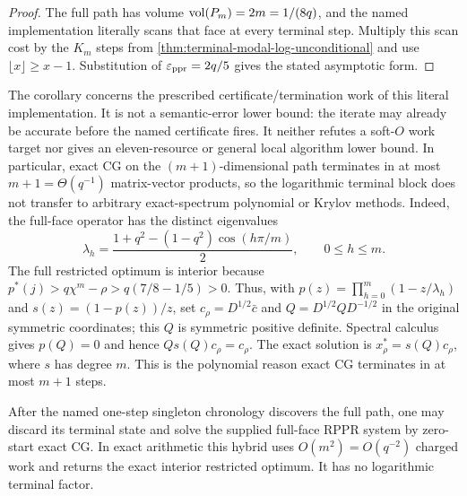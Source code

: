 \begin{proof}
The full path has volume $\operatorname{vol}(P_m)=2m=1/(8q)$, and the named implementation
literally scans that face at every terminal step.  Multiply this scan cost by
the $K_m$ steps from
\cref{thm:terminal-modal-log-unconditional} and use
$\lfloor x\rfloor\ge x-1$.  Substitution of
$\varepsilon_{\mathrm{ppr}}=2q/5$ gives the stated asymptotic form.
\end{proof}

\begin{remark}
The corollary concerns the prescribed certificate/termination work of this
literal implementation.  It is not a semantic-error lower bound: the iterate
may already be accurate before the named certificate fires.  It neither
refutes a soft-$O$ work target nor gives an eleven-resource or general local
algorithm lower bound.  In particular, exact CG on the $(m+1)$-dimensional
path terminates in at most $m+1=\Theta(q^{-1})$ matrix-vector products, so
the logarithmic terminal block does not transfer to arbitrary
exact-spectrum polynomial or Krylov methods.  Indeed, the full-face operator
has the distinct eigenvalues
\[
 \lambda_h=\frac{1+q^2-(1-q^2)\cos(h\pi/m)}2,
 \qquad 0\le h\le m.
\]
The full restricted optimum is interior because
$p^*(j)>q\chi^m-\rho>q(7/8-1/5)>0$.  Thus, with
$p(z)=\prod_{h=0}^m(1-z/\lambda_h)$ and
$s(z)=(1-p(z))/z$, set $c_\rho=D^{1/2}\bar c$ and
$Q=D^{1/2}\widehat QD^{-1/2}$ in the original symmetric coordinates; this
$Q$ is symmetric positive definite.  Spectral calculus gives $p(Q)=0$ and hence
$Qs(Q)c_\rho=c_\rho$.  The exact solution is
$x_\rho^*=s(Q)c_\rho$, where $s$ has degree $m$.
This is the polynomial reason exact CG terminates in at most $m+1$ steps.
\end{remark}

\begin{proposition}
After the named one-step singleton chronology discovers the full path, one
may discard its terminal state and solve the supplied full-face RPPR system
by zero-start exact CG.  In exact arithmetic this hybrid uses
$O(m^2)=O(q^{-2})$ charged work and returns the exact interior restricted
optimum.  It has no logarithmic terminal factor.
\end{proposition}

